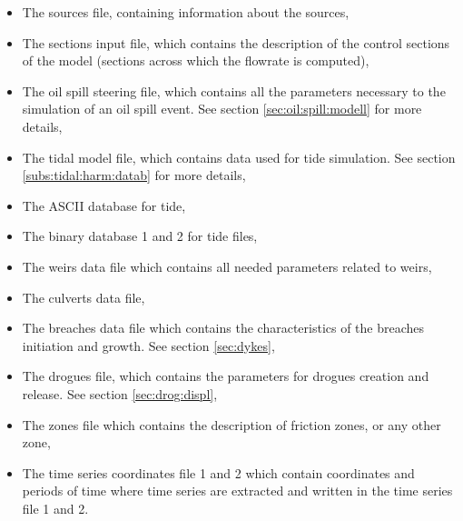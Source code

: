 \begin{itemize}
\item The sources file, containing information about the sources,

\item The sections input file, which contains the description of the control
sections of the model (sections across which the flowrate is computed),

\item The oil spill steering file, which contains all the parameters necessary
to the simulation of an oil spill event.
See section \ref{sec:oil:spill:modell} for more details,

\item The tidal model file, which contains data used for tide simulation.
See section \ref{subs:tidal:harm:datab} for more details,

\item The ASCII database for tide,

\item The binary database 1 and 2 for tide files,

\item The weirs data file which contains all needed parameters related to weirs,

\item The culverts data file,


\item The breaches data file which contains the characteristics of the breaches
initiation and growth.
See section \ref{sec:dykes},

\item The drogues file, which contains the parameters for drogues creation and
release.
See section \ref{sec:drog:displ},

\item The zones file which contains the description of friction zones, or any
other zone,

\item The time series coordinates file 1 and 2 which contain coordinates and
periods of time where time series are extracted and written in the time series
file 1 and 2.


\end{itemize}



